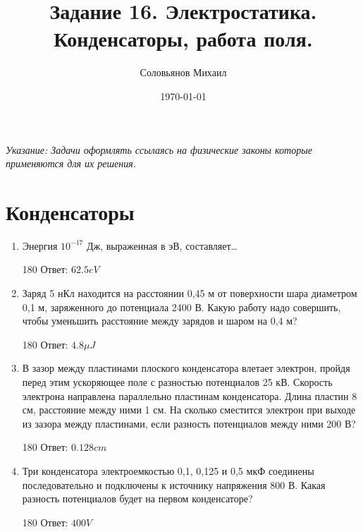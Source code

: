 \documentclass[a4paper,12pt]{article} %
\author{Соловьянов Михаил }
\title{Задание 16. Электростатика.  Конденсаторы, работа поля.}
\date{\today}
\begin{document}
\maketitle



\textit{Указание: Задачи оформлять ссылаясь на физические законы которые применяются для их решения.}




\section{ Конденсаторы }
\begin{enumerate}
	\item	Энергия $10^{-17} $ Дж, выраженная в эВ, составляет…
	\begin{turn}{180} 
	Ответ: $62.5 eV $ 
	\end{turn}


	\item	Заряд 5 нКл находится на расстоянии 0,45 м от поверхности шара диаметром 0,1 м, заряженного до потенциала 2400 В. Какую работу надо совершить, чтобы уменьшить расстояние между зарядов и шаром на 0,4 м?
	\begin{turn}{180} 
	Ответ: $4.8 \mu J  $
	\end{turn}

	\item В зазор между пластинами плоского конденсатора влетает электрон, пройдя перед этим ускоряющее поле с разностью потенциалов 25 кВ. Скорость электрона направлена параллельно пластинам конденсатора. Длина пластин 8 см, расстояние между ними 1 см. На сколько сместится электрон при выходе из зазора между пластинами, если разность потенциалов между ними 200 В?
	\begin{turn}{180} 
	Ответ: $0.128 cm  $
	\end{turn}


	\item Три конденсатора электроемкостью 0,1, 0,125 и 0,5 мкФ соединены последовательно и подключены к источнику напряжения 800 В. Какая разность потенциалов будет на первом конденсаторе?
	\begin{turn}{180} 
	Ответ: $ 400 V  $
	\end{turn}
	

\end{enumerate}
\end{document}
